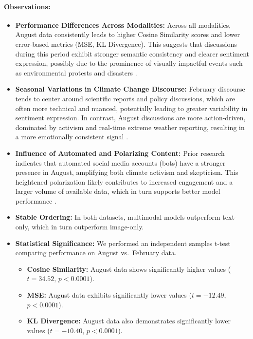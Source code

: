\paragraph{Observations:}
\begin{itemize}
    \item \textbf{Performance Differences Across Modalities:} Across all modalities, August data consistently leads to higher Cosine Similarity scores and lower error-based metrics (MSE, KL Divergence). This suggests that discussions during this period exhibit stronger semantic consistency and clearer sentiment expression, possibly due to the prominence of visually impactful events such as environmental protests and disasters \cite{mooseder_social_2023}. 
    \item \textbf{Seasonal Variations in Climate Change Discourse:} February discourse tends to center around scientific reports and policy discussions, which are often more technical and nuanced, potentially leading to greater variability in sentiment expression. In contrast, August discussions are more action-driven, dominated by activism and real-time extreme weather reporting, resulting in a more emotionally consistent signal \cite{mooseder_social_2023}. 
    \item \textbf{Influence of Automated and Polarizing Content:} Prior research indicates that automated social media accounts (bots) have a stronger presence in August, amplifying both climate activism and skepticism. This heightened polarization likely contributes to increased engagement and a larger volume of available data, which in turn supports better model performance \cite{mooseder_social_2023}.
    \item \textbf{Stable Ordering:} In both datasets, multimodal models outperform text-only, which in turn outperform image-only.
    \item \textbf{Statistical Significance:} We performed an independent samples t-test comparing performance on August vs.\ February data. 
    \begin{itemize}
    \item \textbf{Cosine Similarity:} August data shows significantly higher values ($t = 34.52$, $p < 0.0001$).
    \item \textbf{MSE:} August data exhibits significantly lower values ($t = -12.49$, $p < 0.0001$).
    \item \textbf{KL Divergence:} August data also demonstrates significantly lower values ($t = -10.40$, $p < 0.0001$).
    \end{itemize}
\end{itemize}



